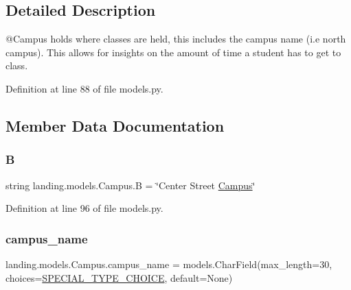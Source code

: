 \subsection{Detailed Description}
\begin{DoxyVerb}@Campus holds where classes are held, this includes the
        campus name (i.e north campus). This allows for insights on
        the amount of time a student has to get to class.
\end{DoxyVerb}
 

Definition at line 88 of file models.\+py.



\subsection{Member Data Documentation}
\mbox{\label{classlanding_1_1models_1_1Campus_a399e7a0a49e00f3989ddcb279895289d}} 
\subsubsection{\texorpdfstring{B}{B}}
{\footnotesize\ttfamily string landing.\+models.\+Campus.\+B = \char`\"{}Center Street \mbox{\hyperlink{classlanding_1_1models_1_1Campus}{Campus}}\char`\"{}\hspace{0.3cm}{\ttfamily [static]}}



Definition at line 96 of file models.\+py.

\mbox{\label{classlanding_1_1models_1_1Campus_ae04580bc0816bb0de3b83563393375f6}} 
\subsubsection{\texorpdfstring{campus\+\_\+name}{campus\_name}}
{\footnotesize\ttfamily landing.\+models.\+Campus.\+campus\+\_\+name = models.\+Char\+Field(max\+\_\+length=30, choices=\mbox{\hyperlink{classlanding_1_1models_1_1Campus_a7db95941da37de92bae99b10b9cdda5e}{S\+P\+E\+C\+I\+A\+L\+\_\+\+T\+Y\+P\+E\+\_\+\+C\+H\+O\+I\+CE}}, default=None)\hspace{0.3cm}{\ttfamily [static]}}



